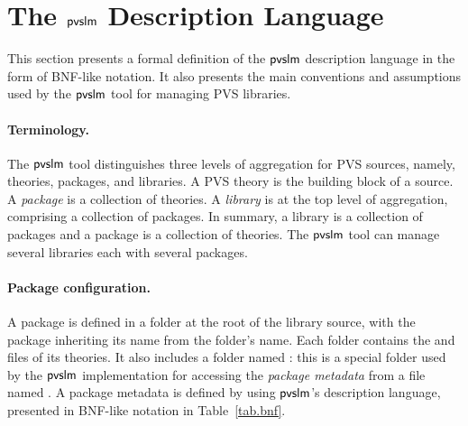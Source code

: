 \section{The $\textsf{pvslm}$ Description Language}
\label{sec.conf}

This section presents a formal definition of the $\textsf{pvslm}$ description
language in the form of BNF-like notation. It also presents the main
conventions and assumptions used by the $\textsf{pvslm}$ tool for managing PVS
libraries.


\paragraph{Terminology.}
The $\textsf{pvslm}$ tool distinguishes three levels of aggregation for PVS
sources, namely, theories, packages, and libraries. A PVS theory is
the building block of a source. A {\em package} is a collection of
theories.  A {\em library} is at the top level of aggregation,
comprising a collection of packages. In summary, a library is a
collection of packages and a package is a collection of theories. The
$\textsf{pvslm}$ tool can manage several libraries each with several packages.

\paragraph{Package configuration.}
A package is defined in a folder at the root of the library source,
with the package inheriting its name from the folder's name. Each
folder contains the  and  files of its theories.  It
also includes a folder named : this is a special folder
used by the $\textsf{pvslm}$ implementation for accessing the {\em package
  metadata} from a file named . A package metadata is
defined by using $\textsf{pvslm}$'s description language,
presented in BNF-like notation in Table~\ref{tab.bnf}.

